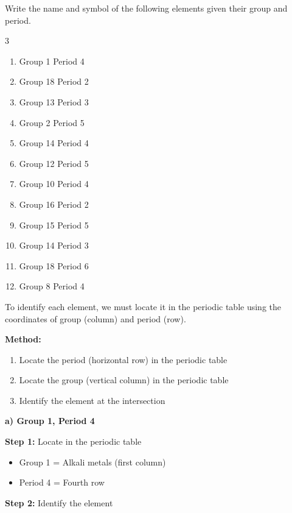 \begin{exercise}
    Write the name and symbol of the following elements given their group and period.
    \begin{multicols}{3}
        \begin{enumerate}[label=\letraminuscula]
        \item Group 1 Period 4
        \item Group 18 Period 2
        \item Group 13 Period 3
        \item Group 2 Period 5
        \item Group 14 Period 4
        \item Group 12 Period 5
        \item Group 10 Period 4
        \item Group 16 Period 2
        \item Group 15 Period 5
        \item Group 14 Period 3
        \item Group 18 Period 6
        \item Group 8 Period 4
        \end{enumerate}
    \end{multicols}
    \begin{solu}
        To identify each element, we must locate it in the periodic table using the coordinates of group (column) and period (row).

        \textbf{Method:}
        \begin{enumerate}
            \item Locate the period (horizontal row) in the periodic table
            \item Locate the group (vertical column) in the periodic table
            \item Identify the element at the intersection
        \end{enumerate}

        \textbf{a) Group 1, Period 4}

        \textbf{Step 1:} Locate in the periodic table
        \begin{itemize}
            \item Group 1 = Alkali metals (first column)
            \item Period 4 = Fourth row
        \end{itemize}

        \textbf{Step 2:} Identify the element


\end{solu}
\end{exercise}
